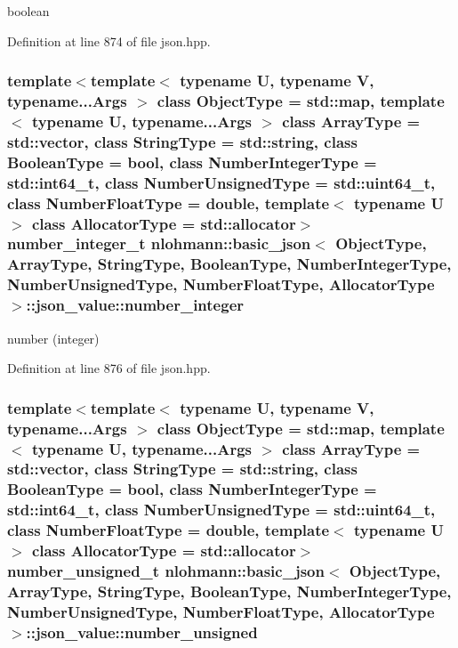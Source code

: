 boolean 



Definition at line 874 of file json.\+hpp.

\hypertarget{unionnlohmann_1_1basic__json_1_1json__value_a13022b922a2a10896e4682949f2c7e49}{}
\subsubsection[{number\+\_\+integer}]{\setlength{\rightskip}{0pt plus 5cm}template$<$template$<$ typename U, typename V, typename...\+Args $>$ class Object\+Type = std\+::map, template$<$ typename U, typename...\+Args $>$ class Array\+Type = std\+::vector, class String\+Type  = std\+::string, class Boolean\+Type  = bool, class Number\+Integer\+Type  = std\+::int64\+\_\+t, class Number\+Unsigned\+Type  = std\+::uint64\+\_\+t, class Number\+Float\+Type  = double, template$<$ typename U $>$ class Allocator\+Type = std\+::allocator$>$ {\bf number\+\_\+integer\+\_\+t} {\bf nlohmann\+::basic\+\_\+json}$<$ Object\+Type, Array\+Type, String\+Type, Boolean\+Type, Number\+Integer\+Type, Number\+Unsigned\+Type, Number\+Float\+Type, Allocator\+Type $>$\+::json\+\_\+value\+::number\+\_\+integer}\label{unionnlohmann_1_1basic__json_1_1json__value_a13022b922a2a10896e4682949f2c7e49}


number (integer) 



Definition at line 876 of file json.\+hpp.

\hypertarget{unionnlohmann_1_1basic__json_1_1json__value_ab19d47585930aa4d85c8e539e9402418}{}
\subsubsection[{number\+\_\+unsigned}]{\setlength{\rightskip}{0pt plus 5cm}template$<$template$<$ typename U, typename V, typename...\+Args $>$ class Object\+Type = std\+::map, template$<$ typename U, typename...\+Args $>$ class Array\+Type = std\+::vector, class String\+Type  = std\+::string, class Boolean\+Type  = bool, class Number\+Integer\+Type  = std\+::int64\+\_\+t, class Number\+Unsigned\+Type  = std\+::uint64\+\_\+t, class Number\+Float\+Type  = double, template$<$ typename U $>$ class Allocator\+Type = std\+::allocator$>$ {\bf number\+\_\+unsigned\+\_\+t} {\bf nlohmann\+::basic\+\_\+json}$<$ Object\+Type, Array\+Type, String\+Type, Boolean\+Type, Number\+Integer\+Type, Number\+Unsigned\+Type, Number\+Float\+Type, Allocator\+Type $>$\+::json\+\_\+value\+::number\+\_\+unsigned}\label{unionnlohmann_1_1basic__json_1_1json__value_ab19d47585930aa4d85c8e539e9402418}


